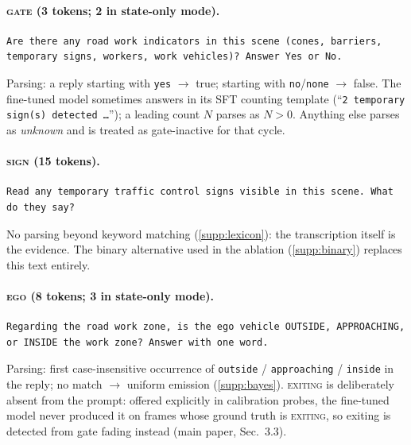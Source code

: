 \documentclass[10pt,twocolumn,letterpaper]{article}
\begin{document}
\paragraph{\textsc{gate} (3 tokens; 2 in state-only mode).}
\begin{lstlisting}
Are there any road work indicators in this scene (cones, barriers, temporary signs, workers, work vehicles)? Answer Yes or No.
\end{lstlisting}
Parsing: a reply starting with \texttt{yes} $\to$ true; starting with \texttt{no}/\texttt{none} $\to$ false.  The fine-tuned model sometimes answers in its SFT counting template (``\texttt{2 temporary sign(s) detected \dots}''); a leading count $N$ parses as $N{>}0$.  Anything else parses as \emph{unknown} and is treated as gate-inactive for that cycle.

\paragraph{\textsc{sign} (15 tokens).}
\begin{lstlisting}
Read any temporary traffic control signs visible in this scene. What do they say?
\end{lstlisting}
No parsing beyond keyword matching (\cref{supp:lexicon}): the transcription itself is the evidence.  The binary alternative used in the ablation (\cref{supp:binary}) replaces this text entirely.

\paragraph{\textsc{ego} (8 tokens; 3 in state-only mode).}
\begin{lstlisting}
Regarding the road work zone, is the ego vehicle OUTSIDE, APPROACHING, or INSIDE the work zone? Answer with one word.
\end{lstlisting}
Parsing: first case-insensitive occurrence of \texttt{outside} / \texttt{approaching} / \texttt{inside} in the reply; no match $\to$ uniform emission (\cref{supp:bayes}).  \textsc{exiting} is deliberately absent from the prompt: offered explicitly in calibration probes, the fine-tuned model never produced it on frames whose ground truth is \textsc{exiting}, so exiting is detected from gate fading instead (main paper, Sec.~3.3).
\end{document}
